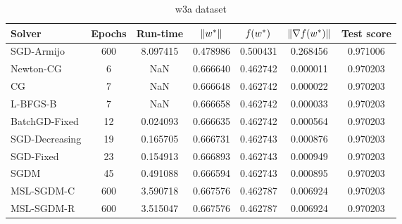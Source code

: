\begin{table}
\centering
\caption{w3a dataset}
\label{tab:w3a-tab}
\begin{tabular}{lS[drop-zero-decimal]S[round-precision=4]S[round-precision=6]S[round-precision=6]S[exponent-mode=scientific]S[round-precision=6]}
\toprule
Solver & {Epochs} & {Run-time} & {$\lVert w^\ast\rVert$} & {$\operatorname*{\mathit{f}}(w^\ast)$} & {$\lVert\nabla f(w^\ast)\rVert$} & {Test score} \\
\midrule
SGD-Armijo & 600 & 8.097415 & 0.478986 & 0.500431 & 0.268456 & 0.971006 \\
Newton-CG & 6 & NaN & 0.666640 & 0.462742 & 0.000011 & 0.970203 \\
CG & 7 & NaN & 0.666648 & 0.462742 & 0.000022 & 0.970203 \\
L-BFGS-B & 7 & NaN & 0.666658 & 0.462742 & 0.000033 & 0.970203 \\
BatchGD-Fixed & 12 & 0.024093 & 0.666635 & 0.462742 & 0.000564 & 0.970203 \\
SGD-Decreasing & 19 & 0.165705 & 0.666731 & 0.462743 & 0.000876 & 0.970203 \\
SGD-Fixed & 23 & 0.154913 & 0.666893 & 0.462743 & 0.000949 & 0.970203 \\
SGDM & 45 & 0.491088 & 0.666594 & 0.462743 & 0.000895 & 0.970203 \\
MSL-SGDM-C & 600 & 3.590718 & 0.667576 & 0.462787 & 0.006924 & 0.970203 \\
MSL-SGDM-R & 600 & 3.515047 & 0.667576 & 0.462787 & 0.006924 & 0.970203 \\
\bottomrule
\end{tabular}
\end{table}

